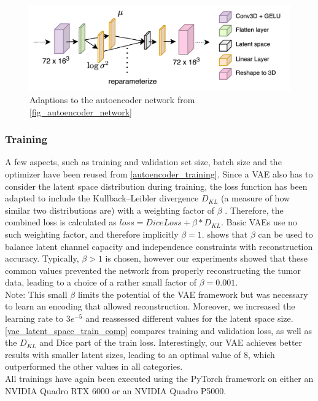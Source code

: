 \begin{figure}[htbp]
  \centering
  \includegraphics[width=450pt]{figures/var_autoencoder_network}
  \caption{Adaptions to the autoencoder network from \autoref{fig_autoencoder_network}}\label{fig_var_autoencoder_network}
\end{figure}
\FloatBarrier
\subsubsection{Training}
A few aspects, such as training and validation set size, batch size and the optimizer have been reused from \autoref{autoencoder_training}.
Since a VAE also has to consider the latent space distribution during training, the loss function has been adapted to include the Kullback–Leibler divergence $D_{KL}$ (a measure of how similar two distributions are) with a weighting factor of $\beta$ \parencite{betaVAE}. Therefore, the combined loss is calculated as $loss = DiceLoss + \beta * D_{KL}$. 
Basic VAEs use no such weighting factor, and therefore implicitly $\beta = 1$. \parencite{betaVAE} shows that $\beta$ can be used to balance latent channel capacity and independence constraints with reconstruction accuracy. 
Typically, $\beta > 1$ is chosen, however our experiments showed that these common values prevented the network from properly reconstructing the tumor data, leading to a choice of a rather small factor of $\beta = 0.001$.\\
Note: This small $\beta$ limits the potential of the VAE framework but was necessary to learn an encoding that allowed reconstruction. Moreover, we increased the learning rate to $3e^{-5}$ and reassessed different values for the latent space size.
\autoref{vae_latent_space_train_comp} compares training and validation loss, as well as the $D_{KL}$ and Dice part of the train loss. 
Interestingly, our VAE achieves better results with smaller latent sizes, leading to an optimal value of 8, which outperformed the other values in all categories.\\
All trainings have again been executed using the PyTorch framework on either an NVIDIA Quadro RTX 6000 or an NVIDIA Quadro P5000.

